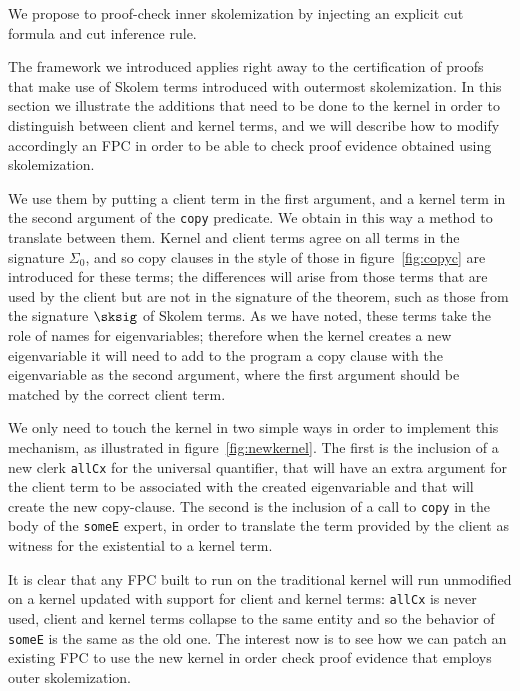 We propose to proof-check inner skolemization by injecting an explicit
cut formula and cut inference rule.



The framework we introduced applies right away to the certification of
proofs that make use of Skolem terms introduced with outermost
skolemization.
%
In this section we illustrate the additions that need to be done to
the \LKF kernel in order to distinguish between client and kernel
terms, and we will describe how to modify accordingly an FPC in order
to be able to check proof evidence obtained using skolemization.

We use them by putting a client term in the first argument, and a
kernel term in the second argument of the \texttt{copy} predicate. We
obtain in this way a method to translate between them.
%
Kernel and client terms agree on all terms in the signature
$\Sigma_0$, and so copy clauses in the style of those in
figure~\ref{fig:copyc} are introduced for these terms; the differences
will arise from those terms that are used by the client but are not in
the signature of the theorem, such as those from the signature
$\sksig$ of Skolem terms.
%
As we have noted, these terms take the role of names for
eigenvariables; therefore when the kernel creates a new eigenvariable
it will need to add to the program a copy clause with the
eigenvariable as the second argument, where the first argument should
be matched by the correct client term.



We only need to touch the kernel in two simple ways in order to
implement this mechanism, as illustrated in
figure~\ref{fig:newkernel}.
%
The first is the inclusion of a new clerk \texttt{allCx} for the
universal quantifier, that will have an extra argument for the client
term to be associated with the created eigenvariable and that will
create the new copy-clause.
%
The second is the inclusion of a call to \texttt{copy} in the body of
the \texttt{someE} expert, in order to translate the term provided by
the client as witness for the existential to a kernel term.

It is clear that any FPC built to run on the traditional kernel will
run unmodified on a kernel updated with support for client and kernel
terms: \texttt{allCx} is never used, client and kernel terms collapse
to the same entity and so the behavior of \texttt{someE} is the same
as the old one.
%
The interest now is to see how we can patch an existing FPC to use the
new kernel in order check proof evidence that employs outer
skolemization.

